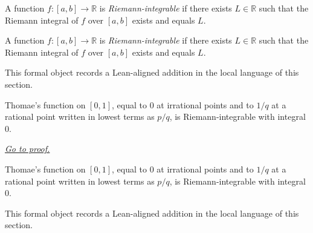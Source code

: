 \begin{definition}
\label{def:is-riemann-integrable}
A function $f:[a,b]\to\mathbb R$ is \emph{Riemann-integrable} if there exists $L\in\mathbb R$ such that the Riemann integral of $f$ over $[a,b]$ exists and equals $L$.
\end{definition}

\begin{remark*}
A function $f:[a,b]\to\mathbb R$ is \emph{Riemann-integrable} if there exists $L\in\mathbb R$ such that the Riemann integral of $f$ over $[a,b]$ exists and equals $L$.
\end{remark*}

\begin{remark*}[Interpretation]
This formal object records a Lean-aligned addition in the local language of this section.
\end{remark*}

\begin{dependencies}
\NoLocalDependencies
\end{dependencies}
\begin{theorem}
\label{thm:thomae-riemann-integrable-zero}
Thomae's function on $[0,1]$, equal to $0$ at irrational points and to $1/q$ at a rational point written in lowest terms as $p/q$, is Riemann-integrable with integral $0$.

\smallskip
\noindent
\hyperref[prf:thomae-riemann-integrable-zero]{\textit{Go to proof.}}
\end{theorem}

\begin{remark*}
Thomae's function on $[0,1]$, equal to $0$ at irrational points and to $1/q$ at a rational point written in lowest terms as $p/q$, is Riemann-integrable with integral $0$.
\end{remark*}

\begin{remark*}[Interpretation]
This formal object records a Lean-aligned addition in the local language of this section.
\end{remark*}

